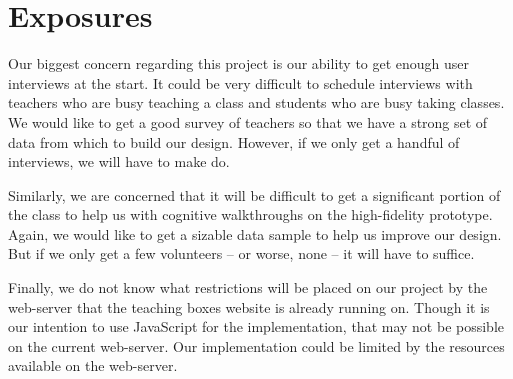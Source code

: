 \documentclass[12pt,titlepage]{article}
\begin{document}
\section{Exposures}
Our biggest concern regarding this project is our ability to get enough user
interviews at the start. It could be very difficult to schedule interviews with
teachers who are busy teaching a class and students who are busy taking classes.
We would like to get a good survey of teachers so that we have a strong set of
data from which to build our design. However, if we only get a handful of
interviews, we will have to make do.

Similarly, we are concerned that it will be difficult to get a significant
portion of the class to help us with cognitive walkthroughs on the high-fidelity
prototype. Again, we would like to get a sizable data sample to help us improve
our design. But if we only get a few volunteers -- or worse, none -- it will
have to suffice.

Finally, we do not know what restrictions will be placed on our project by the
web-server that the teaching boxes website is already running on. Though it is
our intention to use JavaScript for the implementation, that may not be possible
on the current web-server. Our implementation could be limited by the resources
available on the web-server.
\end{document}
